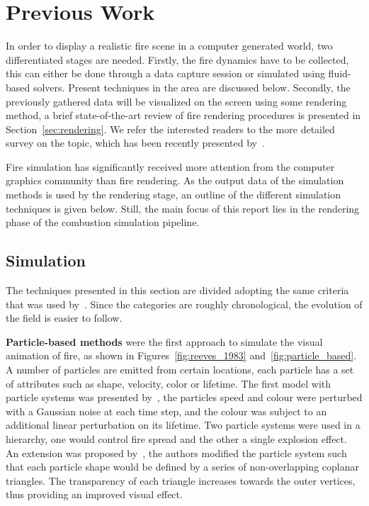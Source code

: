 \chapter{Previous Work}
\label{ch:previous_work}

In order to display a realistic fire scene in a computer generated world, two differentiated stages are needed.
Firstly, the fire dynamics have to be collected, this can either be done through a data capture session or simulated using fluid-based solvers.
Present techniques in the area are discussed below. 
Secondly, the previously gathered data will be visualized on the screen using some rendering method, a brief state-of-the-art review of fire rendering procedures is presented in Section~\ref{sec:rendering}.
We refer the interested readers to the more detailed survey on the topic, which has been recently presented by~\cite{Huang:2014}.

Fire simulation has significantly received more attention from the computer graphics community than fire rendering.
As the output data of the simulation methods is used by the rendering stage, an outline of the different simulation techniques is given below. 
Still, the main focus of this report lies in the rendering phase of the combustion simulation pipeline.

\section{Simulation}
\label{sec:simulation}


The techniques presented in this section are divided adopting the same criteria that was used by~\cite{Huang:2014}.
Since the categories are roughly chronological, the evolution of the field is easier to follow.

\textbf{Particle-based methods} were the first approach to simulate the visual animation of fire, as shown in Figures~\ref{fig:reeves_1983} and~\ref{fig:particle_based}.
A number of particles are emitted from certain locations, each particle has a set of attributes such as shape, velocity, color or lifetime.
The first model with particle systems was presented by~\cite{Reeves:1983}, the particles speed and colour were perturbed with a Gaussian noise at each time step, and the colour was subject to an additional linear perturbation on its lifetime.
Two particle systems were used in a hierarchy, one would control fire spread and the other a single explosion effect.
An extension was proposed by~\cite{Perry:1994}, the authors modified the particle system such that each particle shape would be defined by a series of non-overlapping coplanar triangles.
The transparency of each triangle increases towards the outer vertices, thus providing an improved visual effect.

